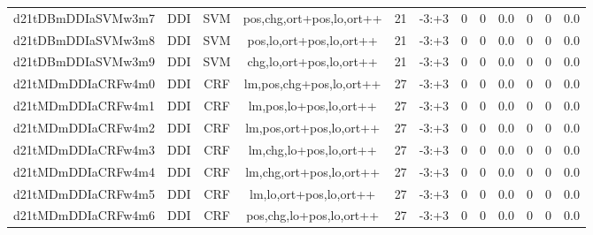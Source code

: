 \documentclass[a4paper]{article}
\begin{document}
\begin{landscape}
\begin{center}
\begin{tabular}{ |c|c|c|c|c|c|c|c|c|c|c|c|}
 
 	
 	\small{ d21tDBmDDIaSVMw3m7 } & \small{ DDI} & \small{  SVM }  & pos,chg,ort+pos,lo,ort++  &  21 &  \small{  -3:+3 }  &  0 & 0 & 0.0  &  0 & 0 & 0.0 \\
 	

 
 	
 	\small{ d21tDBmDDIaSVMw3m8 } & \small{ DDI} & \small{  SVM }  & pos,lo,ort+pos,lo,ort++  &  21 &  \small{  -3:+3 }  &  0 & 0 & 0.0  &  0 & 0 & 0.0 \\
 	

 
 	
 	\small{ d21tDBmDDIaSVMw3m9 } & \small{ DDI} & \small{  SVM }  & chg,lo,ort+pos,lo,ort++  &  21 &  \small{  -3:+3 }  &  0 & 0 & 0.0  &  0 & 0 & 0.0 \\
 	

 
 	
 	\small{ d21tMDmDDIaCRFw4m0 } & \small{ DDI} & \small{  CRF }  & lm,pos,chg+pos,lo,ort++  &  27 &  \small{  -3:+3 }  &  0 & 0 & 0.0  &  0 & 0 & 0.0 \\
 	

 
 	
 	\small{ d21tMDmDDIaCRFw4m1 } & \small{ DDI} & \small{  CRF }  & lm,pos,lo+pos,lo,ort++  &  27 &  \small{  -3:+3 }  &  0 & 0 & 0.0  &  0 & 0 & 0.0 \\
 	

 
 	
 	\small{ d21tMDmDDIaCRFw4m2 } & \small{ DDI} & \small{  CRF }  & lm,pos,ort+pos,lo,ort++  &  27 &  \small{  -3:+3 }  &  0 & 0 & 0.0  &  0 & 0 & 0.0 \\
 	

 
 	
 	\small{ d21tMDmDDIaCRFw4m3 } & \small{ DDI} & \small{  CRF }  & lm,chg,lo+pos,lo,ort++  &  27 &  \small{  -3:+3 }  &  0 & 0 & 0.0  &  0 & 0 & 0.0 \\
 	

 
 	
 	\small{ d21tMDmDDIaCRFw4m4 } & \small{ DDI} & \small{  CRF }  & lm,chg,ort+pos,lo,ort++  &  27 &  \small{  -3:+3 }  &  0 & 0 & 0.0  &  0 & 0 & 0.0 \\
 	

 
 	
 	\small{ d21tMDmDDIaCRFw4m5 } & \small{ DDI} & \small{  CRF }  & lm,lo,ort+pos,lo,ort++  &  27 &  \small{  -3:+3 }  &  0 & 0 & 0.0  &  0 & 0 & 0.0 \\
 	

 
 	
 	\small{ d21tMDmDDIaCRFw4m6 } & \small{ DDI} & \small{  CRF }  & pos,chg,lo+pos,lo,ort++  &  27 &  \small{  -3:+3 }  &  0 & 0 & 0.0  &  0 & 0 & 0.0 \\
 	


\end{tabular}
\end{center}
\end{landscape}
\end{document}
